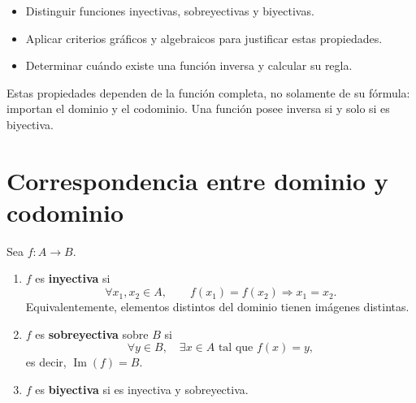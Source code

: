 \ifdefined\documentoSemanal
\else
\usepackage{tikz}
\usepackage{estilo_apuntes}
\usetikzlibrary{arrows.meta,babel}

\fi

\ifdefined\documentoSemanal
\else
{}

\begin{objetivos}
\begin{itemize}
  \item Distinguir funciones inyectivas, sobreyectivas y biyectivas.
  \item Aplicar criterios gráficos y algebraicos para justificar estas propiedades.
  \item Determinar cuándo existe una función inversa y calcular su regla.
\end{itemize}
\end{objetivos}

\begin{resumen}
Estas propiedades dependen de la función completa, no solamente de su fórmula: importan el dominio y el codominio. Una función posee inversa si y solo si es biyectiva.
\end{resumen}
\fi

\section*{Correspondencia entre dominio y codominio}

\begin{definicion}
Sea $f:A\to B$.
\begin{enumerate}
  \item $f$ es \textbf{inyectiva} si
  \[
  \forall x_1,x_2\in A,\qquad f(x_1)=f(x_2)\Longrightarrow x_1=x_2.
  \]
  Equivalentemente, elementos distintos del dominio tienen imágenes distintas.
  \item $f$ es \textbf{sobreyectiva} sobre $B$ si
  \[
  \forall y\in B,\quad \exists x\in A\text{ tal que }f(x)=y,
  \]
  es decir, $\operatorname{Im}(f)=B$.
  \item $f$ es \textbf{biyectiva} si es inyectiva y sobreyectiva.
\end{enumerate}
\end{definicion}

